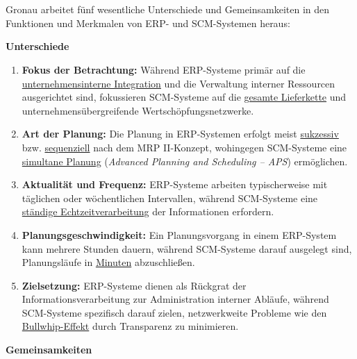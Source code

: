 \section{ } \par Gronau \cite[253]{10} arbeitet fünf wesentliche Unterschiede und Gemeinsamkeiten in den Funktionen und Merkmalen von \acs{ERP}- und \acs{SCM}-Systemen heraus: \par \textbf{Unterschiede}
\begin{enumerate}[label=\arabic*.), leftmargin=*]
    \item \textbf{Fokus der Betrachtung:} Während \acs{ERP}-Systeme primär auf die \uline{unternehmensinterne Integration} und die Verwaltung interner Ressourcen ausgerichtet sind, fokussieren \acs{SCM}-Systeme auf die \uline{gesamte Lieferkette} und unternehmensübergreifende Wertschöpfungsnetzwerke.
    \item \textbf{Art der Planung:} Die Planung in \acs{ERP}-Systemen erfolgt meist \uline{sukzessiv} \acs{bzw.} \uline{sequenziell} nach dem \acs{MRP} II-Konzept, wohingegen \acs{SCM}-Systeme eine \uline{simultane Planung} (\textit{Advanced Planning and Scheduling – \acs{APS}}) ermöglichen.
    \item \textbf{Aktualität und Frequenz:} \acs{ERP}-Systeme arbeiten typischerweise mit täglichen oder wöchentlichen Intervallen, während \acs{SCM}-Systeme eine \uline{ständige Echtzeitverarbeitung} der Informationen erfordern.
    \item \textbf{Planungsgeschwindigkeit:} Ein Planungsvorgang in einem \acs{ERP}-System kann mehrere Stunden dauern, während \acs{SCM}-Systeme darauf ausgelegt sind, Planungsläufe in \uline{Minuten} abzuschließen.
    \item \textbf{Zielsetzung:} \acs{ERP}-Systeme dienen als Rückgrat der Informationsverarbeitung zur Administration interner Abläufe, während \acs{SCM}-Systeme spezifisch darauf zielen, netzwerkweite Probleme wie den \uline{Bullwhip-Effekt} durch Transparenz zu minimieren.
\end{enumerate}
\textbf{Gemeinsamkeiten}
